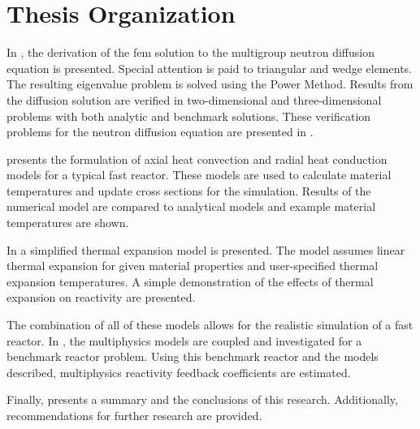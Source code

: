 \section{Thesis Organization}
  In , the derivation of the \gls{fem} solution to
  the multigroup neutron diffusion equation is presented. Special attention is
  paid to triangular and wedge elements. The resulting eigenvalue problem is
  solved using the Power Method. Results from the diffusion solution are
  verified in two-dimensional and three-dimensional problems with both analytic 
  and benchmark solutions. These verification problems for the neutron diffusion
  equation are presented in .

   presents the formulation of axial heat convection
  and radial heat conduction models for a typical fast reactor. These models are 
  used to calculate material temperatures and update cross sections for the 
  simulation. Results of the numerical model are compared to analytical models 
  and example material temperatures are shown.

  In  a simplified thermal expansion model is
  presented. The model assumes linear thermal expansion for given material
  properties and user-specified thermal expansion temperatures. A simple
  demonstration of the effects of thermal expansion on reactivity are presented.

  The combination of all of these models allows for the realistic simulation of
  a fast reactor. In , the multiphysics models are
  coupled and investigated for a benchmark reactor problem. Using this benchmark
  reactor and the models described, multiphysics reactivity feedback
  coefficients are estimated.
 
  Finally,  presents a summary and the conclusions of this
  research. Additionally, recommendations for further research are provided.

